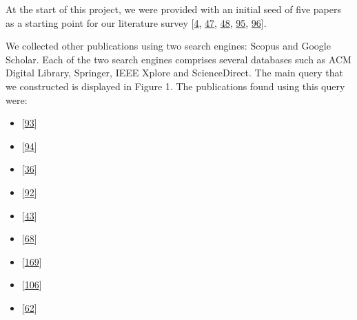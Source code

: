 \documentclass[]{book}
\providecommand{\tightlist}{%
  \setlength{\itemsep}{0pt}\setlength{\parskip}{0pt}}
\begin{document}
At the start of this project, we were provided with an initial seed of
five papers as a starting point for our literature survey
{[}\protect\hyperlink{ref-adams2016a}{4},
\protect\hyperlink{ref-da2014a}{47},
\protect\hyperlink{ref-da2016a}{48},
\protect\hyperlink{ref-khomh2015a}{95},
\protect\hyperlink{ref-khomh2012a}{96}{]}.

We collected other publications using two search engines: Scopus and
Google Scholar. Each of the two search engines comprises several
databases such as ACM Digital Library, Springer, IEEE Xplore and
ScienceDirect. The main query that we constructed is displayed in Figure
1. The publications found using this query were:

\begin{itemize}
\tightlist
\item
  {[}\protect\hyperlink{ref-kaur2019a}{93}{]}
\item
  {[}\protect\hyperlink{ref-kerzazi2013a}{94}{]}
\item
  {[}\protect\hyperlink{ref-castelluccio2017a}{36}{]}
\item
  {[}\protect\hyperlink{ref-karvonen2017a}{92}{]}
\item
  {[}\protect\hyperlink{ref-claes2017a}{43}{]}
\item
  {[}\protect\hyperlink{ref-fujibayashi2017a}{68}{]}
\item
  {[}\protect\hyperlink{ref-souza2015a}{169}{]}
\item
  {[}\protect\hyperlink{ref-laukkanen2018a}{106}{]}
\item
  {[}\protect\hyperlink{ref-dyck2015a}{62}{]}
\end{itemize}
\end{document}
